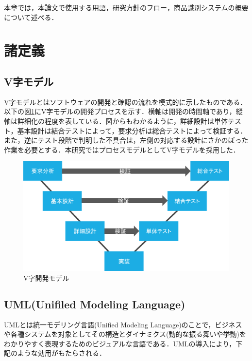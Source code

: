 

本章では，本論文で使用する用語，研究方針のフロー，商品識別システムの概要について述べる．

\section{諸定義}


\subsection*{V字モデル}

V字モデルとはソフトウェアの開発と確認の流れを模式的に示したものである．以下の図\ref{vji}にV字モデルの開発プロセスを示す．横軸は開発の時間軸であり，縦軸は詳細化の程度を表している\cite{kumikomi}．図からもわかるように，詳細設計は単体テスト，基本設計は結合テストによって，要求分析は総合テストによって検証する．また，逆にテスト段階で判明した不具合は，左側の対応する設計にさかのぼった作業を必要とする\cite{soft}．本研究ではプロセスモデルとしてV字モデルを採用した．

\begin{figure}[htbp]
\centering
\includegraphics[width=15cm]{./picture/vjimodel.eps}
\caption{V字開発モデル}
\label{vji}
\end{figure}


\subsection*{UML(Unifiled Modeling Language)}

UMLとは統一モデリング言語(Unified Modeling Language)のことで，ビジネスや各種システムを対象としてその構造とダイナミクス(動的な振る舞いや挙動)をわかりやすく表現するためのビジュアルな言語\cite{uml}である．UMLの導入により，下記のような効用がもたらされる\cite{uml}．

